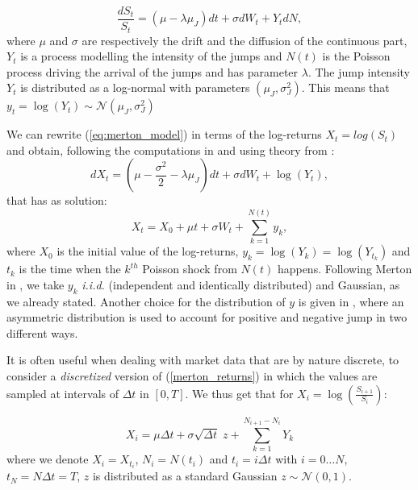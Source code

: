 \begin{equation}
\label{eq:merton_model}
\frac{dS_t}{S_t} = (\mu - \lambda \mu_J) dt + \sigma dW_t  + Y_t dN,
\end{equation}
\noindent
where $\mu$ and $\sigma$ are respectively the drift and the diffusion of the continuous part, $Y_t$ is a process modelling the intensity of the jumps and $N(t)$ is the Poisson process driving the arrival of the jumps and has parameter $\lambda$.
The jump intensity $Y_t$ is distributed as a log-normal with parameters $(\mu_J, \sigma_J^2)$. This means that $ y_t = \log(Y_t) \sim \mathcal{N}(\mu_J, \sigma_J^2)$

We can rewrite (\ref{eq:merton_model}) in terms of the log-returns $X_t = log(S_t)$ and obtain, following the computations in \citep{MARTIN2007} and using theory from \citep{TANKOV2015}:
\begin{equation}
dX_t = (\mu - \frac{\sigma^2}{2} - \lambda \mu_J)dt + \sigma dW_t + \log(Y_t),
\end{equation}
\noindent
that has as solution:
\begin{equation}
\label{merton_returns}
X_t =X_0 +  \mu t + \sigma W_t + \sum_{k=1}^{N(t)} y_k,
\end{equation}
\noindent
where $X_0$ is the initial value of the log-returns, $y_k= \log(Y_k) = \log(Y_{t_k})$ and $t_k$ is the time when the $k^{th}$ Poisson shock from $N(t)$ happens. 
Following Merton in \citep{MERTON1976}, we take $y_k$ \textit{i.i.d.} (independent and identically distributed) and Gaussian, as we already stated.
Another choice for the distribution of $y$ is given in \citep{KOU2002}, where an asymmetric distribution is used to account for positive and negative jump in two different ways. 


It is often useful when dealing with market data that are by nature discrete, to consider a \textit{discretized} version of (\ref{merton_returns}) in which the values are sampled at intervals of $\Delta t$ in $[0, T]$. We thus get that for $X_i = \log(\frac{S_{i+1}}{S_i})$:

\begin{equation}
\label{discrete_returns}
X_i =  \mu \Delta t + \sigma \sqrt{\Delta t} \; z +  \sum_{k=1}^{N_{i+1} - N_i} Y_k
\end{equation}
\noindent
where we denote $X_i = X_{t_i}$, $N_i = N(t_i)$ and $t_i = i \Delta t$ with $i= 0 \dots N$, $t_N = N \Delta t= T$,  $z$ is distributed as a standard Gaussian $ z\sim \mathcal{N}(0,1)$.

